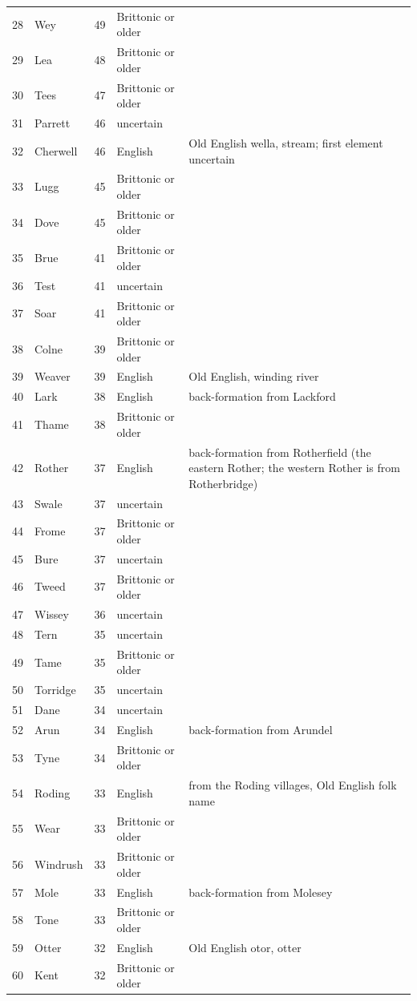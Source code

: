 \documentclass[11pt,a4paper]{article}
\begin{document}
\begin{small}
\begin{longtable}{rlrlp{6.6cm}}
28 & Wey & 49 & Brittonic or older & \\
29 & Lea & 48 & Brittonic or older & \\
30 & Tees & 47 & Brittonic or older & \\
31 & Parrett & 46 & uncertain & \\
32 & Cherwell & 46 & English & Old English wella, stream; first element uncertain\\
33 & Lugg & 45 & Brittonic or older & \\
34 & Dove & 45 & Brittonic or older & \\
35 & Brue & 41 & Brittonic or older & \\
36 & Test & 41 & uncertain & \\
37 & Soar & 41 & Brittonic or older & \\
38 & Colne & 39 & Brittonic or older & \\
39 & Weaver & 39 & English & Old English, winding river\\
40 & Lark & 38 & English & back-formation from Lackford\\
41 & Thame & 38 & Brittonic or older & \\
42 & Rother & 37 & English & back-formation from Rotherfield (the eastern Rother; the western Rother is from Rotherbridge)\\
43 & Swale & 37 & uncertain & \\
44 & Frome & 37 & Brittonic or older & \\
45 & Bure & 37 & uncertain & \\
46 & Tweed & 37 & Brittonic or older & \\
47 & Wissey & 36 & uncertain & \\
48 & Tern & 35 & uncertain & \\
49 & Tame & 35 & Brittonic or older & \\
50 & Torridge & 35 & uncertain & \\
51 & Dane & 34 & uncertain & \\
52 & Arun & 34 & English & back-formation from Arundel\\
53 & Tyne & 34 & Brittonic or older & \\
54 & Roding & 33 & English & from the Roding villages, Old English folk name\\
55 & Wear & 33 & Brittonic or older & \\
56 & Windrush & 33 & Brittonic or older & \\
57 & Mole & 33 & English & back-formation from Molesey\\
58 & Tone & 33 & Brittonic or older & \\
59 & Otter & 32 & English & Old English otor, otter\\
60 & Kent & 32 & Brittonic or older & \\
\bottomrule\end{longtable}\end{small}
\end{document}
